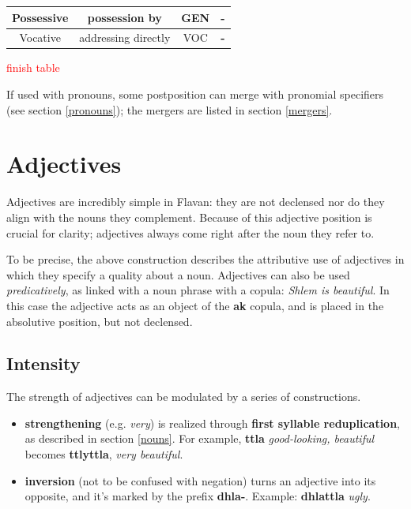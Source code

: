 \documentclass[10pt,oneside]{memoir}
\newcommand{\cmmnt}[1]{\textcolor{red}{#1}}
\begin{document}
\begin{center}
\begin{tabular}[]{ |  c | c | c | >{\bfseries}c | }
\hline\hline
Possessive & possession by & GEN & - \\
\hline\hline
Vocative & addressing directly & VOC & - \\
\hline
\end{tabular} 
\end{center}

\cmmnt{finish table}

If used with pronouns, some postposition can merge with pronomial specifiers (see section \ref{pronouns}); the mergers are listed in section \ref{mergers}.


\section{Adjectives}

Adjectives are incredibly simple in Flavan: they are not declensed nor do they align with the nouns they complement. Because of this adjective position is crucial for clarity; adjectives always come right after the noun they refer to.

To be precise, the above construction describes the attributive use of adjectives in which they specify a quality about a noun. Adjectives can also be used \emph{predicatively}, as linked with a noun phrase with a copula: \emph{Shlem is beautiful}. In this case the adjective acts as an object of the \textbf{ak} copula, and is placed in the absolutive position, but not declensed. %


\subsection{Intensity}

The strength of adjectives can be modulated by a series of constructions.

\begin{itemize}
    \item \textbf{strengthening} (e.g. \emph{very}) is realized through \textbf{first syllable reduplication}, as described in section \ref{nouns}. For example, \textbf{ttla} \emph{good-looking, beautiful} becomes \textbf{ttlyttla}, \emph{very beautiful}.
	\item \textbf{inversion} (not to be confused with negation) turns an adjective into its opposite, and it's marked by the prefix \textbf{dhla-}. Example: \textbf{dhlattla} \emph{ugly}.
\end{itemize}
\end{document}
